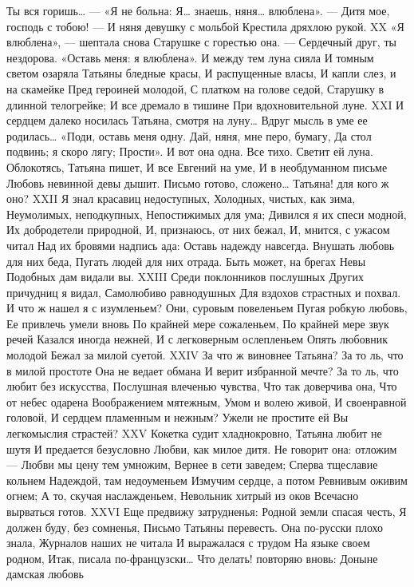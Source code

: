 Ты вся горишь… — «Я не больна:
Я… знаешь, няня… влюблена».
— Дитя мое, господь с тобою! —
И няня девушку с мольбой
Крестила дряхлою рукой.
XX
«Я влюблена», — шептала снова
Старушке с горестью она.
— Сердечный друг, ты нездорова.
«Оставь меня: я влюблена».
И между тем луна сияла
И томным светом озаряла
Татьяны бледные красы,
И распущенные власы,
И капли слез, и на скамейке
Пред героиней молодой,
С платком на голове седой,
Старушку в длинной телогрейке;
И все дремало в тишине
При вдохновительной луне.
XXI
И сердцем далеко носилась
Татьяна, смотря на луну…
Вдруг мысль в уме ее родилась…
«Поди, оставь меня одну.
Дай, няня, мне перо, бумагу,
Да стол подвинь; я скоро лягу;
Прости». И вот она одна.
Все тихо. Светит ей луна.
Облокотясь, Татьяна пишет,
И все Евгений на уме,
И в необдуманном письме
Любовь невинной девы дышит.
Письмо готово, сложено…
Татьяна! для кого ж оно?
XXII
Я знал красавиц недоступных,
Холодных, чистых, как зима,
Неумолимых, неподкупных,
Непостижимых для ума;
Дивился я их спеси модной,
Их добродетели природной,
И, признаюсь, от них бежал,
И, мнится, с ужасом читал
Над их бровями надпись ада:
Оставь надежду навсегда.
Внушать любовь для них беда,
Пугать людей для них отрада.
Быть может, на брегах Невы
Подобных дам видали вы.
XXIII
Среди поклонников послушных
Других причудниц я видал,
Самолюбиво равнодушных
Для вздохов страстных и похвал.
И что ж нашел я с изумленьем?
Они, суровым повеленьем
Пугая робкую любовь,
Ее привлечь умели вновь
По крайней мере сожаленьем,
По крайней мере звук речей
Казался иногда нежней,
И с легковерным ослепленьем
Опять любовник молодой
Бежал за милой суетой.
XXIV
За что ж виновнее Татьяна?
За то ль, что в милой простоте
Она не ведает обмана
И верит избранной мечте?
За то ль, что любит без искусства,
Послушная влеченью чувства,
Что так доверчива она,
Что от небес одарена
Воображением мятежным,
Умом и волею живой,
И своенравной головой,
И сердцем пламенным и нежным?
Ужели не простите ей
Вы легкомыслия страстей?
XXV
Кокетка судит хладнокровно,
Татьяна любит не шутя
И предается безусловно
Любви, как милое дитя.
Не говорит она: отложим —
Любви мы цену тем умножим,
Вернее в сети заведем;
Сперва тщеславие кольнем
Надеждой, там недоуменьем
Измучим сердце, а потом
Ревнивым оживим огнем;
А то, скучая наслажденьем,
Невольник хитрый из оков
Всечасно вырваться готов.
XXVI
Еще предвижу затрудненья:
Родной земли спасая честь,
Я должен буду, без сомненья,
Письмо Татьяны перевесть.
Она по-русски плохо знала,
Журналов наших не читала
И выражалася с трудом
На языке своем родном,
Итак, писала по-французски…
Что делать! повторяю вновь:
Доныне дамская любовь
